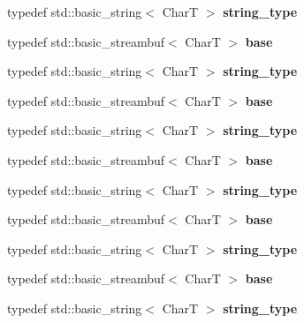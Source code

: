 \begin{DoxyCompactItemize}
typedef std\+::basic\+\_\+string$<$ CharT $>$ {\bfseries string\+\_\+type}
\item 
\mbox{\label{structtestbuf_a24884ed0e0845a4640bb2b7cbdf60ad6}} 
typedef std\+::basic\+\_\+streambuf$<$ CharT $>$ {\bfseries base}
\item 
\mbox{\label{structtestbuf_a0576cc53e1f395f08cee680528575b9f}} 
typedef std\+::basic\+\_\+string$<$ CharT $>$ {\bfseries string\+\_\+type}
\item 
\mbox{\label{structtestbuf_a24884ed0e0845a4640bb2b7cbdf60ad6}} 
typedef std\+::basic\+\_\+streambuf$<$ CharT $>$ {\bfseries base}
\item 
\mbox{\label{structtestbuf_a0576cc53e1f395f08cee680528575b9f}} 
typedef std\+::basic\+\_\+string$<$ CharT $>$ {\bfseries string\+\_\+type}
\item 
\mbox{\label{structtestbuf_a24884ed0e0845a4640bb2b7cbdf60ad6}} 
typedef std\+::basic\+\_\+streambuf$<$ CharT $>$ {\bfseries base}
\item 
\mbox{\label{structtestbuf_a0576cc53e1f395f08cee680528575b9f}} 
typedef std\+::basic\+\_\+string$<$ CharT $>$ {\bfseries string\+\_\+type}
\item 
\mbox{\label{structtestbuf_a24884ed0e0845a4640bb2b7cbdf60ad6}} 
typedef std\+::basic\+\_\+streambuf$<$ CharT $>$ {\bfseries base}
\item 
\mbox{\label{structtestbuf_a0576cc53e1f395f08cee680528575b9f}} 
typedef std\+::basic\+\_\+string$<$ CharT $>$ {\bfseries string\+\_\+type}
\item 
\mbox{\label{structtestbuf_a24884ed0e0845a4640bb2b7cbdf60ad6}} 
typedef std\+::basic\+\_\+streambuf$<$ CharT $>$ {\bfseries base}
\item 
\mbox{\label{structtestbuf_a0576cc53e1f395f08cee680528575b9f}} 
typedef std\+::basic\+\_\+string$<$ CharT $>$ {\bfseries string\+\_\+type}
\item 
\mbox{\label{structtestbuf_a24884ed0e0845a4640bb2b7cbdf60ad6}} 

\end{DoxyCompactItemize}
